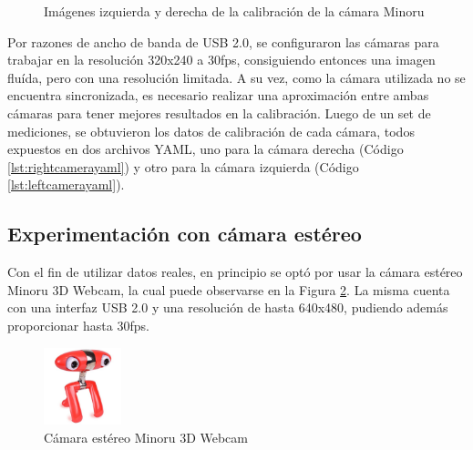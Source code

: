 \begin{figure}[!ht]
    \centering
    \qquad
    \caption{Imágenes izquierda y derecha de la calibración de la cámara Minoru}
    \label{fig:minorurightleft}
\end{figure}

Por razones de ancho de banda de USB 2.0, se configuraron las cámaras para trabajar en la resolución 320x240 a 30fps, consiguiendo entonces una imagen fluída, pero con una resolución limitada. A su vez, como la cámara utilizada no se encuentra sincronizada, es necesario realizar una aproximación entre ambas cámaras para tener mejores resultados en la calibración. Luego de un set de mediciones, se obtuvieron los datos de calibración de cada cámara, todos expuestos en dos archivos YAML, uno para la cámara derecha (Código \ref{lst:rightcamerayaml}) y otro para la cámara izquierda (Código \ref{lst:leftcamerayaml}).



\fi

\ifimagenes
\subsection{Experimentación con cámara estéreo}
Con el fin de utilizar datos reales, en principio se optó por usar la cámara estéreo Minoru 3D Webcam, la cual puede observarse en la Figura \ref{fig:minoru3dwebcam}. La misma cuenta con una interfaz USB 2.0 y una resolución de hasta 640x480, pudiendo además proporcionar hasta 30fps.
\begin{figure}
    \centering
    \includegraphics[width=0.2\textwidth]{Img/Minoru.jpeg}
    \caption{Cámara estéreo Minoru 3D Webcam}
    \label{fig:minoru3dwebcam}
\end{figure}

